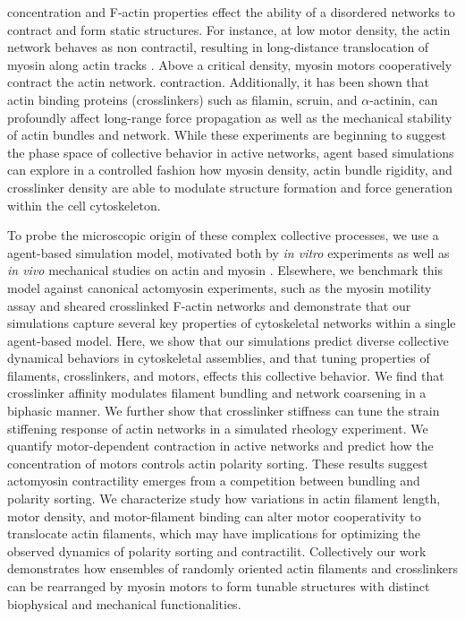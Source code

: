 \documentclass[12pt]{article}
\begin{document}
concentration and F-actin properties effect the ability of a disordered networks
to contract and form static structures\cite{murrell2012, murrell2014, stam2016}.
For instance, at low motor density, the 
actin network behaves as non contractil, resulting in long-distance 
translocation of myosin along actin tracks \cite{burov2013}. Above a
critical density, myosin motors cooperatively contract the actin network.
contraction. Additionally, it has been shown that actin binding proteins 
(crosslinkers) such as filamin, scruin, and $\alpha$-actinin, can profoundly 
affect long-range force propagation as well as the mechanical stability of actin
bundles and network\cite{murrell2012, murrell2014, murrell2015, gardel2004}. 
While these experiments are beginning to suggest the phase space of 
collective behavior in active networks, agent based simulations can explore in a
controlled fashion how myosin density, actin bundle rigidity, and crosslinker
density are able to modulate structure formation and force generation within the
cell cytoskeleton. 
\par
To probe the microscopic origin of these complex collective processes, we 
use a agent-based simulation model, motivated both by {\em in vitro } 
experiments as well as {\em in vivo} mechanical studies on actin and myosin 
\cite{guha2005,wilson2010}.  Elsewhere, we benchmark this model against 
canonical actomyosin experiments, such as the myosin motility assay and sheared 
crosslinked F-actin networks \cite{freedman2016} and demonstrate that our 
simulations capture several key properties of cytoskeletal networks within a
single agent-based model. 
Here, we show that our simulations predict diverse collective dynamical behaviors
in cytoskeletal assemblies, and that tuning properties of filaments, 
crosslinkers, and motors, effects this collective behavior. 
We find that crosslinker affinity modulates filament bundling and network 
coarsening in a biphasic manner. We further show that crosslinker 
stiffness can tune the strain stiffening response of actin networks in a 
simulated rheology experiment. We quantify motor-dependent contraction in active
networks and predict how the concentration of motors controls actin polarity 
sorting. These results suggest actomyosin contractility emerges from a 
competition between bundling and polarity sorting. We characterize study how 
variations in actin filament length, motor density, and motor-filament binding 
can alter motor cooperativity to translocate actin filaments, which may have
implications for optimizing the observed dynamics of polarity sorting and 
contractilit. Collectively our work demonstrates how ensembles of randomly
oriented actin filaments and crosslinkers can be rearranged by myosin motors to 
form tunable structures with distinct biophysical and mechanical functionalities. 
\end{document}
